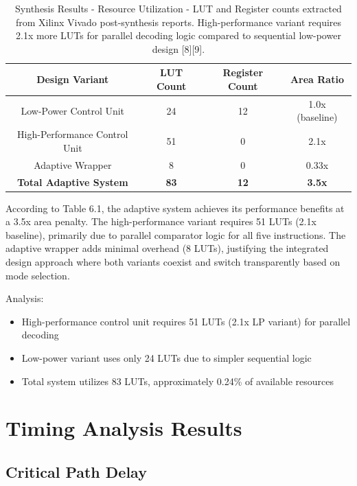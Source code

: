 \documentclass[15pt,a4paper]{report}
\begin{document}
\begin{table}[H]
    \centering
    \begin{tabular}{|c|c|c|c|}
        \hline
        \textbf{Design Variant} & \textbf{LUT Count} & \textbf{Register Count} & \textbf{Area Ratio} \\
        \hline
        Low-Power Control Unit & 24 & 12 & 1.0x (baseline) \\
        \hline
        High-Performance Control Unit & 51 & 0 & 2.1x \\
        \hline
        Adaptive Wrapper & 8 & 0 & 0.33x \\
        \hline
        \textbf{Total Adaptive System} & \textbf{83} & \textbf{12} & \textbf{3.5x} \\
        \hline
    \end{tabular}
    \label{tab:resource_util}
    \caption{Synthesis Results - Resource Utilization - LUT and Register counts extracted from Xilinx Vivado post-synthesis reports. High-performance variant requires 2.1x more LUTs for parallel decoding logic compared to sequential low-power design [8][9].}
\end{table}

According to Table 6.1, the adaptive system achieves its performance benefits at a 3.5x area penalty. The high-performance variant requires 51 LUTs (2.1x baseline), primarily due to parallel comparator logic for all five instructions. The adaptive wrapper adds minimal overhead (8 LUTs), justifying the integrated design approach where both variants coexist and switch transparently based on mode selection.

Analysis:
\begin{itemize}
    \item High-performance control unit requires 51 LUTs (2.1x LP variant) for parallel decoding
    \item Low-power variant uses only 24 LUTs due to simpler sequential logic
    \item Total system utilizes 83 LUTs, approximately 0.24\% of available resources
\end{itemize}

\section{Timing Analysis Results}

\subsection{Critical Path Delay}
\end{document}
